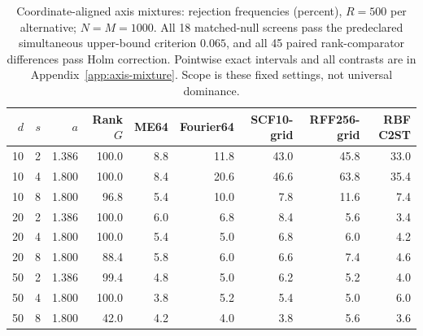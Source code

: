 \begin{table}[t]\centering
\caption{Coordinate-aligned axis mixtures: rejection frequencies (percent), $R=500$ per alternative; $N=M=1000$. All 18 matched-null screens pass the predeclared simultaneous upper-bound criterion $0.065$, and all 45 paired rank-comparator differences pass Holm correction. Pointwise exact intervals and all contrasts are in Appendix~\ref{app:axis-mixture}. Scope is these fixed settings, not universal dominance.}
\label{tab:axis-main}
\scriptsize{\setlength{\tabcolsep}{8pt}\renewcommand{\arraystretch}{1.2}
\begin{tabular}{rrrrrrrrr}\toprule
$d$ & $s$ & $a$ & Rank $G$ & ME64 & Fourier64 & SCF10-grid & RFF256-grid & RBF C2ST\\\midrule
10 & 2 & 1.386 & 100.0 & 8.8 & 11.8 & 43.0 & 45.8 & 33.0\\
10 & 4 & 1.800 & 100.0 & 8.4 & 20.6 & 46.6 & 63.8 & 35.4\\
10 & 8 & 1.800 & 96.8 & 5.4 & 10.0 & 7.8 & 11.6 & 7.4\\
20 & 2 & 1.386 & 100.0 & 6.0 & 6.8 & 8.4 & 5.6 & 3.4\\
20 & 4 & 1.800 & 100.0 & 5.4 & 5.0 & 6.8 & 6.0 & 4.2\\
20 & 8 & 1.800 & 88.4 & 5.8 & 6.0 & 6.6 & 7.4 & 4.6\\
50 & 2 & 1.386 & 99.4 & 4.8 & 5.0 & 6.2 & 5.2 & 4.0\\
50 & 4 & 1.800 & 100.0 & 3.8 & 5.2 & 5.4 & 5.0 & 6.0\\
50 & 8 & 1.800 & 42.0 & 4.2 & 4.0 & 3.8 & 5.6 & 3.6\\
\bottomrule\end{tabular}}
\end{table}
